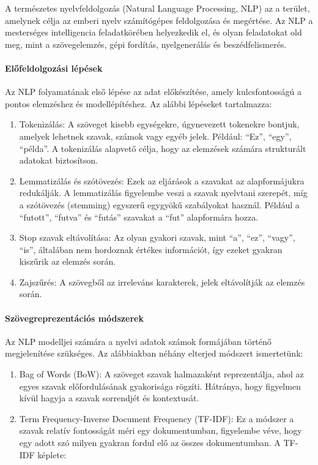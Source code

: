 \documentclass[11pt]{article}
\begin{document}
A természetes nyelvfeldolgozás (Natural Language Processing, NLP) az a
terület, amelynek célja az emberi nyelv számítógépes feldolgozása és
megértése. Az NLP a mesterséges intelligencia feladatkörében helyezkedik
el, és olyan feladatokat old meg, mint a szövegelemzés, gépi fordítás,
nyelgenerálás és beszédfelismerés.

\paragraph{Előfeldolgozási
lépések}\label{elux151feldolgozuxe1si-luxe9puxe9sek}

Az NLP folyamatának első lépése az adat előkészítése, amely
kulcsfontosságú a pontos elemzéshez és modellépítéshez. Az alábbi
lépéseket tartalmazza:

\begin{enumerate}
\def\labelenumi{\arabic{enumi}.}
\item
  Tokenizálás: A szöveget kisebb egységekre, úgynevezett tokenekre
  bontjuk, amelyek lehetnek szavak, számok vagy egyéb jelek. Például:
  ``Ez'', ``egy'', ``példa''. A tokenizálás alapvető célja, hogy az
  elemzések számára strukturált adatokat biztosítson.
\item
  Lemmatizálás és szótövezés: Ezek az eljárások a szavakat az
  alapformájukra redukálják. A lemmatizálás figyelembe veszi a szavak
  nyelvtani szerepét, míg a szótövezés (stemming) egyszerű egygyökű
  szabályokat használ. Például a ``futott'', ``futva'' és ``futás''
  szavakat a ``fut'' alapformára hozza.
\item
  Stop szavak eltávolítása: Az olyan gyakori szavak, mint ``a'', ``ez'',
  ``vagy'', ``is'', általában nem hordoznak értékes információt, így
  ezeket gyakran kiszűrik az elemzés során.
\item
  Zajszűrés: A szövegből az irreleváns karakterek, jelek eltávolítják az
  elemzés során.
\end{enumerate}

\paragraph{Szövegreprezentációs
módszerek}\label{szuxf6vegreprezentuxe1ciuxf3s-muxf3dszerek}

Az NLP modelljei számára a nyelvi adatok számok formájában történő
megjelenítése szükséges. Az alábbiakban néhány elterjed módszert
ismertetünk:

\begin{enumerate}
\def\labelenumi{\arabic{enumi}.}
\item
  Bag of Words (BoW): A szöveget szavak halmazaként reprezentálja, ahol
  az egyes szavak előfordulásának gyakorisága rögzíti. Hátránya, hogy
  figyelmen kívül hagyja a szavak sorrendjét és kontextusát.
\item
  Term Frequency-Inverse Document Frequency (TF-IDF): Ez a módszer a
  szavak relatív fontosságát méri egy dokumentumban, figyelembe véve,
  hogy egy adott szó milyen gyakran fordul elő az összes dokumentumban.
  A TF-IDF képlete:
\end{enumerate}
\end{document}
